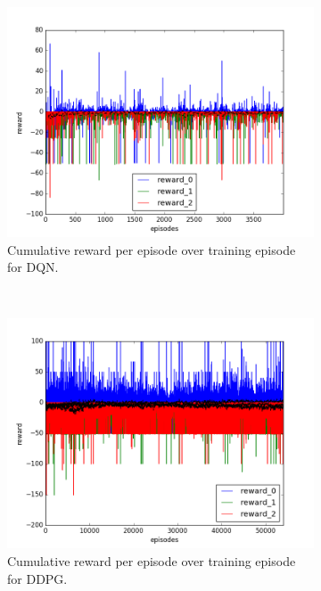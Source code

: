 \begin{figure}[h]
  \begin{subfigure}[h]{\figscale\linewidth}
    \includegraphics[trim=10 10 10 10,clip,width=\linewidth]
    {../results/dqn_2vs1/reward.png}
    \caption{Cumulative reward per episode over training episode for DQN.}
    \label{fig:dqn-2vs1-reward}
  \end{subfigure}
  ~
  \begin{subfigure}[h]{\figscale\linewidth}
    \includegraphics[trim=10 10 10 10,clip,width=\linewidth]
    {../results/ddpg_2vs1/reward.png}
    \caption{Cumulative reward per episode over training episode for DDPG.}
    \label{fig:ddpg-2vs1-reward}
  \end{subfigure}
  ~
  \begin{subfigure}[h]{\figscale\linewidth}

\end{subfigure}
\end{figure}
